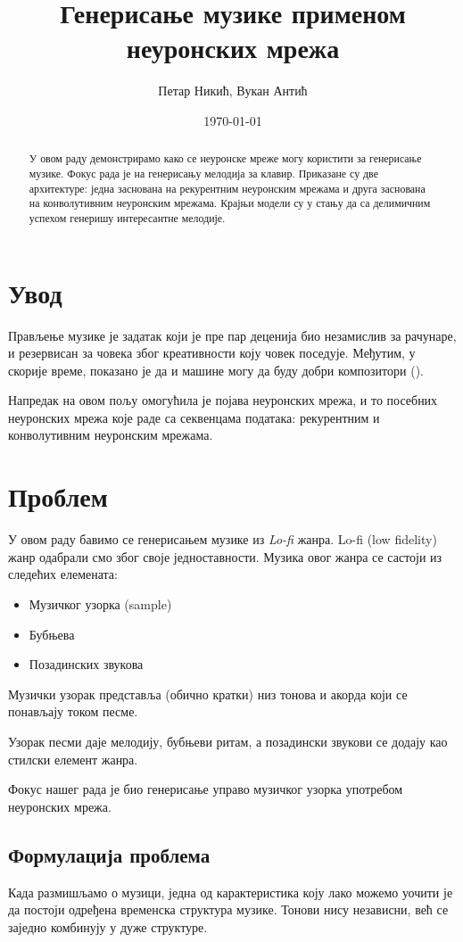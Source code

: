 \documentclass[11pt]{article}
\author{Петар Никић, Вукан Антић}
\date{\today}
\title{Генерисање музике применом неуронских мрежа}
\begin{document}
\maketitle
\begin{abstract}
У овом раду демонстрирамо како се неуронске мреже могу користити за генерисање музике. Фокус рада је на генерисању мелодија за клавир. Приказане су две архитектуре: једна заснована на рекурентним неуронским мрежама и друга заснована на конволутивним неуронским мрежама. Крајњи модели су у стању да са делимичним успехом генеришу интересантне мелодије.
\end{abstract}

\section{Увод}
\label{sec:org3572ae7}
Прављење музике је задатак који је пре пар деценија био незамислив за рачунаре, и резервисан за човека због креативности коју човек поседује. Међутим, у скорије време, показано је да и машине могу да буду добри композитори (\cite{van_der_oord_wavenet_2016}).

Напредак на овом пољу омогућила је појава неуронских мрежа, и то посебних неуронских мрежа које раде са секвенцама података: рекурентним и конволутивним неуронским мрежама.

\section{Проблем}
\label{sec:org2995f58}
У овом раду бавимо се генерисањем музике из \emph{Lo-fi} жанра. Lo-fi (low fidelity) жанр одабрали смо због своје једноставности. Музика овог жанра се састоји из следећих елемената:
\begin{itemize}
\item Музичког узорка (sample)
\item Бубњева
\item Позадинских звукова
\end{itemize}

Музички узорак представља (обично кратки) низ тонова и акорда који се понављају током песме.

Узорак песми даје мелодију, бубњеви ритам, а позадински звукови се додају као стилски елемент жанра.

Фокус нашег рада је био генерисање управо музичког узорка употребом неуронских мрежа.

\subsection{Формулација проблема}
\label{sec:org5232f06}
Када размишљамо о музици, једна од карактеристика коју лако можемо уочити је да постоји одређена временска структура музике. Тонови нису независни, већ се заједно комбинују у дуже структуре.
\end{document}
